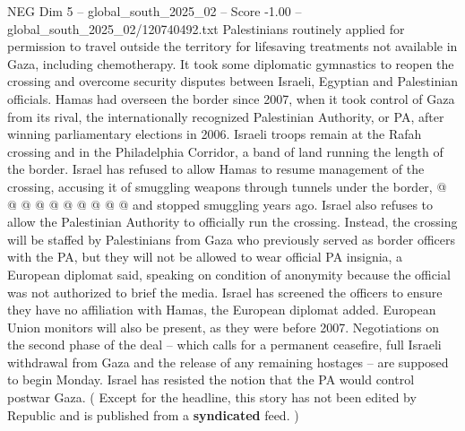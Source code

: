 \begin{textsample}{NEG Dim 5 – global\_south\_2025\_02 – Score -1.00 – global\_south\_2025\_02/120740492.txt}
Palestinians routinely applied for permission to travel outside the territory for lifesaving treatments not available in Gaza, including chemotherapy.
It took some diplomatic gymnastics to reopen the crossing and overcome security disputes between Israeli, Egyptian and Palestinian officials.
Hamas had overseen the border since 2007, when it took control of Gaza from its rival, the internationally recognized Palestinian Authority, or PA, after winning parliamentary elections in 2006.
Israeli troops remain at the Rafah crossing and in the Philadelphia Corridor, a band of land running the length of the border.
Israel has refused to allow Hamas to resume management of the crossing, accusing it of smuggling weapons through tunnels under the border, @ @ @ @ @ @ @ @ @ @ and stopped smuggling years ago.
Israel also refuses to allow the Palestinian Authority to officially run the crossing.
Instead, the crossing will be staffed by Palestinians from Gaza who previously served as border officers with the PA, but they will not be allowed to wear official PA insignia, a European diplomat said, speaking on condition of anonymity because the official was not authorized to brief the media.
Israel has screened the officers to ensure they have no affiliation with Hamas, the European diplomat added.
European Union monitors will also be present, as they were before 2007.
Negotiations on the second phase of the deal -- which calls for a permanent ceasefire, full Israeli withdrawal from Gaza and the release of any remaining hostages -- are supposed to begin Monday.
Israel has resisted the notion that the PA would control postwar Gaza. ( Except for the headline, this story has not been edited by Republic and is published from a \textbf{syndicated} feed. )

\end{textsample}
